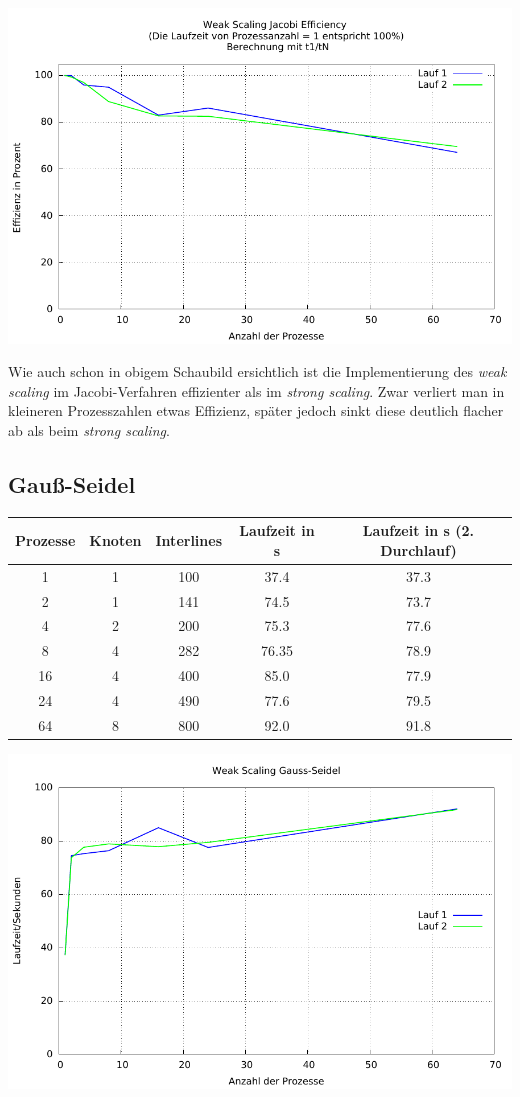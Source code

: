 \documentclass[a4paper]{article}
\begin{document}
\includegraphics[scale=0.8]{img/WEAK_SCALING_JA_efficiency.pdf}

Wie auch schon in obigem Schaubild ersichtlich ist die Implementierung des \textit{weak scaling} im Jacobi-Verfahren effizienter als im \textit{strong scaling}. Zwar verliert man in kleineren Prozesszahlen etwas Effizienz, später jedoch sinkt diese deutlich flacher ab als beim \textit{strong scaling}.

\subsection{Gauß-Seidel}
\begin{tabular}{|c|c|c|c|c|}
\hline 
Prozesse & Knoten & Interlines & Laufzeit in s & Laufzeit in s (2. Durchlauf) \\ 
\hline 
1 & 1 & 100 & 37.4 & 37.3 \\ 
\hline 
2 & 1 & 141 & 74.5 & 73.7 \\ 
\hline 
4 & 2 & 200 & 75.3 & 77.6 \\ 
\hline 
8 & 4 & 282 & 76.35 & 78.9 \\ 
\hline 
16 & 4 & 400 & 85.0 & 77.9 \\ 
\hline 
24 & 4 & 490 & 77.6 & 79.5 \\ 
\hline 
64 & 8 & 800 & 92.0 & 91.8 \\ 
\hline 
\end{tabular} 

\includegraphics[scale=0.8]{img/WEAK_SCALING_GS_laufzeit.pdf}
\end{document}
